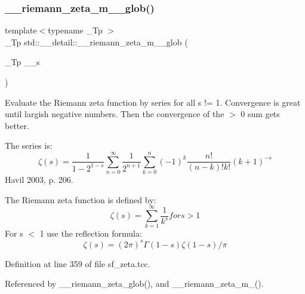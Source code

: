 \mbox{\label{namespacestd_1_1____detail_ac7a15aa2658fef76642cebd7858fa0ff}} 
\subsubsection{\texorpdfstring{\+\_\+\+\_\+riemann\+\_\+zeta\+\_\+m\+\_\+\_\+glob()}{\_\_riemann\_zeta\_m\_1\_glob()}}
{\footnotesize\ttfamily template$<$typename \+\_\+\+Tp $>$ \\
\+\_\+\+Tp std\+::\+\_\+\+\_\+detail\+::\+\_\+\+\_\+riemann\+\_\+zeta\+\_\+m\+\_\+\_\+glob (\begin{DoxyParamCaption}\item[{\+\_\+\+Tp}]{\+\_\+\+\_\+s }\end{DoxyParamCaption})}



Evaluate the Riemann zeta function by series for all s != 1. Convergence is great until largish negative numbers. Then the convergence of the $>$ 0 sum gets better. 

The series is\+: \[ \zeta(s) = \frac{1}{1-2^{1-s}} \sum_{n=0}^{\infty} \frac{1}{2^{n+1}} \sum_{k=0}^{n} (-1)^k \frac{n!}{(n-k)!k!} (k+1)^{-s} \] Havil 2003, p. 206.

The Riemann zeta function is defined by\+: \[ \zeta(s) = \sum_{k=1}^{\infty} \frac{1}{k^{s}} for s > 1 \] For s $<$ 1 use the reflection formula\+: \[ \zeta(s) = (2\pi)^s \Gamma(1-s) \zeta(1-s) / \pi \] 

Definition at line 359 of file sf\+\_\+zeta.\+tcc.



Referenced by \+\_\+\+\_\+riemann\+\_\+zeta\+\_\+glob(), and \+\_\+\+\_\+riemann\+\_\+zeta\+\_\+m\+\_().

\mbox{\label{namespacestd_1_1____detail_a917935f42a21af90b78a19ea81349129}} 
